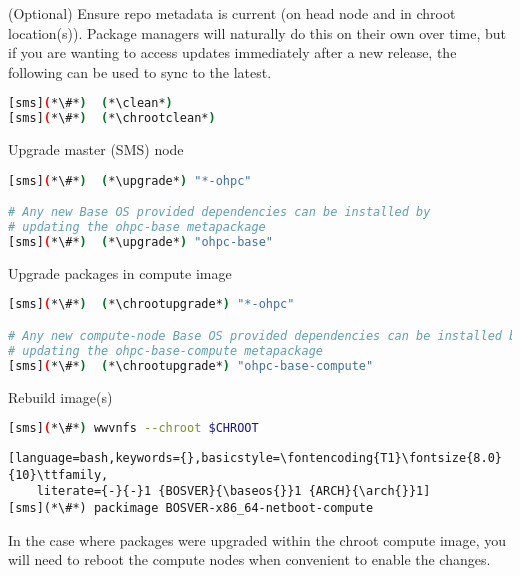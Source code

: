 \begin{enumerate*}
\item (Optional) Ensure repo metadata is current (on head node and in chroot
  location(s)). Package managers will naturally do this on their own over time,
  but if you are wanting to access updates immediately after a new release,
  the following can be used to sync to the latest.

\begin{lstlisting}[language=bash,keywords={}]
[sms](*\#*)  (*\clean*)
[sms](*\#*)  (*\chrootclean*)
\end{lstlisting}

\item Upgrade master (SMS) node

\begin{lstlisting}[language=bash,keywords={}]
[sms](*\#*)  (*\upgrade*) "*-ohpc"

# Any new Base OS provided dependencies can be installed by
# updating the ohpc-base metapackage
[sms](*\#*)  (*\upgrade*) "ohpc-base"
\end{lstlisting}

\item Upgrade packages in compute image

\begin{lstlisting}[language=bash,keywords={}]
[sms](*\#*)  (*\chrootupgrade*) "*-ohpc"

# Any new compute-node Base OS provided dependencies can be installed by
# updating the ohpc-base-compute metapackage
[sms](*\#*)  (*\chrootupgrade*) "ohpc-base-compute"
\end{lstlisting}

\item Rebuild image(s)

\begin{lstlisting}[language=bash,keywords={}]
[sms](*\#*) wwvnfs --chroot $CHROOT
\end{lstlisting}
\fi

\begin{lstlisting}[language=bash,keywords={},basicstyle=\fontencoding{T1}\fontsize{8.0}{10}\ttfamily,
    literate={-}{-}1 {BOSVER}{\baseos{}}1 {ARCH}{\arch{}}1]
[sms](*\#*) packimage BOSVER-x86_64-netboot-compute
\end{lstlisting}
\fi

\end{enumerate*}

\noindent In the case where packages were upgraded within the chroot compute image,
you will need to reboot the compute nodes when convenient to enable the
changes.

